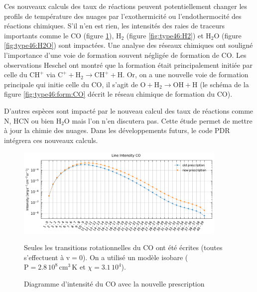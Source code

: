 Ces nouveaux calculs des taux de réactions peuvent potentiellement changer les profils de température des nuages par l'exothermicité ou l'endothermocité des réactions chimiques. S'il n'en est rien, les intensités des raies de traceurs importants comme le $\mathrm{CO}$ (figure \ref{fig:type46:CO}), $\mathrm{H}_2$ (figure \ref{fig:type46:H2}) et $\mathrm{H}_2\mathrm{O}$ (figure \ref{fig:type46:H2O}) sont impactées. Une analyse des réseaux chimiques ont souligné l'importance d'une voie de formation souvent négligée de formation de $\mathrm{CO}$. Les observations Heschel ont montré que la formation  était principalement initiée par celle du $\mathrm{CH}^+$ via $\mathrm{C}^+ + \mathrm{H}_2 \rightarrow \mathrm{CH}^+ + \mathrm{H}$. Or, on a une nouvelle voie de formation principale qui initie celle du $\mathrm{CO}$, il s'agit de $\mathrm{O} + \mathrm{H}_2 \rightarrow \mathrm{OH} + \mathrm{H}$ (le schéma de la figure \ref{fig:type46:form:CO} décrit le réseau chimique de formation du $\mathrm{CO}$). \newline 


D'autres espèces sont impacté par le nouveau calcul des taux de réactions comme $\mathrm{N}$, $\mathrm{HCN}$ ou bien $\mathrm{H}_2\mathrm{O}$ mais l'on n'en discutera pas. Cette étude permet de mettre à jour la chimie des nuages. Dans les développements futurs, le code PDR intégrera ces nouveaux calculs. 


\begin{figure}[!h]
    \centering \includegraphics[trim = {0 0 0 1cm},clip,width=0.9\textwidth]{figure/type46/I_comp_CO.pdf}
    \caption{Diagramme d'intensité du $\mathrm{CO}$ avec la nouvelle prescription}
    \begin{minipage}{\textwidth}
    Seules les transitions rotationnelles du $\mathrm{CO}$ ont été écrites (toutes s'effectuent à $\mathrm{v}=0$). On a utilisé un modèle isobare ($\mathrm{P} = 2.8\,10^{8} \,\mathrm{cm}^3\,\mathrm{K}$ et $\chi = 3.1\, 10^4$).
    \end{minipage}
    \label{fig:type46:CO}
\end{figure}

